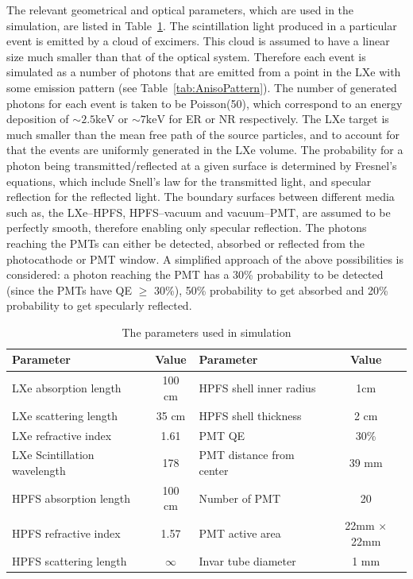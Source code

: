 The relevant geometrical and optical parameters, which are used in the simulation, are listed in Table~\ref{tab:OptPar}. 
The scintillation light produced in a particular 
event is emitted by a cloud of excimers. This cloud is assumed to have a linear size much smaller than that 
of the optical system. Therefore each event is simulated as a number of photons that are emitted from a point 
in the LXe with some emission pattern (see Table~\ref{tab:AnisoPattern}). The number of generated photons for each event is taken to be Poisson(50), which correspond to an energy deposition of $\sim2.5\mathrm{keV}$  or $\sim7\mathrm{keV}$ for ER or NR respectively. The LXe target is much smaller than the mean free path of the source particles, and to 
account for that the events are uniformly generated in the LXe volume.
The probability for a photon being transmitted/reflected at a given surface is 
determined by Fresnel's equations, which include Snell's law for the transmitted light, 
and specular reflection for the reflected light. The boundary surfaces between different media
such as, the LXe--HPFS, HPFS--vacuum and vacuum--PMT, are assumed to be perfectly smooth, 
therefore enabling only specular reflection. 
The photons reaching the PMTs can either be detected, absorbed or reflected from the photocathode 
or PMT window. A simplified approach of the above possibilities is considered:
a photon reaching the PMT has a 30\% probability to be detected (since the PMTs have QE $\geq$ 30\%), 
50\% probability to get absorbed and 20\% probability to get specularly reflected. 

\begin{table}[h]
  \centering
  \label{tab:OptPar}
  \begin{tabular}{|l c||l c|}
  \hline
  Parameter & Value & Parameter & Value \\
  \hline
  LXe absorption length & 100 cm & HPFS shell inner radius & 1cm \\
  LXe scattering length & 35 cm & HPFS shell thickness & 2 cm\\
  LXe refractive index & 1.61  & PMT QE &  30\% \\
  LXe Scintillation wavelength & 178& PMT distance from center & 39 mm\\
  HPFS absorption length & 100 cm  & Number of PMT & 20 \\
  HPFS refractive index & 1.57 & PMT active area & 22mm $\times$ 22mm \\
  HPFS scattering length & $\infty$ & Invar tube diameter & 1 mm\\
  \hline
 \end{tabular}
   \caption{The parameters used in simulation}

\end{table}


